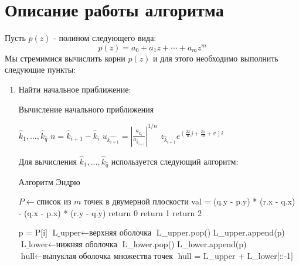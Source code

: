 \documentclass[a4paper,12pt]{article}
\begin{document}
\section{Описание работы алгоритма}
Пусть $p(z)$ - полином следующего вида:
$$p(z) = a_0 + a_{1}z + \text{···} + a_{m}z^{m}$$
Мы стремимися вычислить корни $p(z)$ и для этого необходимо выполнить следующие пункты:
\begin{enumerate}
    \item Найти начальное приближение:
        \begin{algorithm}
            \caption{Вычисление начального приближения}\label{alg:Example}
            \begin{algorithmic}
            \State {} $\hat{k}_1,\text{...}, \hat{k}_{\hat{q}}$  
                \State $n=\hat{k}_{i+1}-\hat{k}_i$
                \State $u_{\hat{k_{i+1}}}=\left| \frac{a_{\hat{k}_i}}{a_{\hat{k}_{i+1}}} \right|^{1/n}$
                    \State $z_{\hat{k}_{i+1}}e^{\left(\frac{2\pi}{n}j + \frac{2\pi}{m} + \sigma\right)i}$
                \EndFor
            \EndFor 
            \end{algorithmic}
        \end{algorithm}

        Для вычисления $\hat{k}_1,\text{...}, \hat{k}_{\hat{q}}$ используется следующий алгоритм:
        \begin{algorithm}[H]
            \caption{Алгоритм Эндрю}\label{alg:Example}
            \begin{algorithmic}
            \State $P\gets \text{список из $m$ точек в двумерной плоскости}$
            \State {}
                \State val = (q.y - p.y) * (r.x - q.x) - (q.x - p.x) * (r.y - q.y)
                    \State return 0
                    \State return 1
                \Else
                    \State return 2
                \EndIf
            \EndFunction

            \State $\text{p = P[i]}$
            \State $\text{L\_upper} \gets \text{верхняя оболочка}$
                \State L\_upper.pop()
            \EndWhile
            \State L\_upper.append(p)
            \State $\text{L\_lower} \gets \text{нижняя оболочка}$
                \State L\_lower.pop()
            \EndWhile
            \State L\_lower.append(p)
            \EndFor
            \State $\text{hull} \gets \text{выпуклая оболочка множества точек}$ 
            \State hull = L\_upper + L\_lower[::-1]
            \end{algorithmic}
        \end{algorithm}




\end{enumerate}
\end{document}
